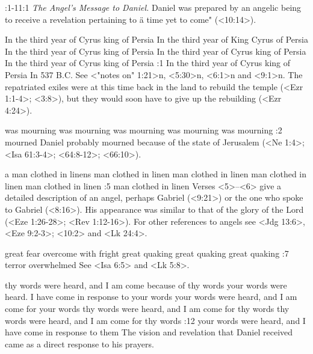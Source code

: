 :1-11:1 {} {\it The Angel's Message to Daniel.}\/ 
Daniel was prepared by an angelic being to receive a revelation pertaining to \"a time yet to come" (<10:14>).

    {In the third year of Cyrus king of Persia} %
    {In the third year of King Cyrus of Persia} %
    {In the third year of Cyrus king of Persia} %
    {In the third year of Cyrus king of Persia} %
    {In the third year of Cyrus king of Persia} %
:1 {In the third year of Cyrus king of Persia} In 537 B.C. See <"notes on" 1:21>n, <5:30>n, <6:1>n and <9:1>n. The repatriated exiles were at this 
time back in the land to rebuild the temple (<Ezr 1:1-4>; <3:8>), but they would soon have to give up the rebuilding (<Ezr 4:24>).

    {was mourning} %
    {was mourning} %
    {was mourning} %
    {was mourning} %
    {was mourning} %
:2 {mourned} Daniel probably mourned because of the state of Jerusalem (<Ne 1:4>; <Isa 61:3-4>; <64:8-12>; <66:10>).

    {a man clothed in linens} %
    {man clothed in linen} %
    {man clothed in linen} %
    {man clothed in linen} %
    {man clothed in linen} %
:5 {man clothed in linen} Verses <5>--<6> give a detailed description of an angel, perhaps Gabriel (<9:21>) or the one who spoke to  Gabriel (<8:16>). 
His appearance was similar to that of the glory of the Lord (<Eze 1:26-28>; <Rev 1:12-16>). For other references to angels see <Jdg 13:6>, <Eze 9:2-3>; <10:2> and <Lk 24:4>.

    {great fear} %
    {overcome with fright} %
    {great quaking} %
    {great quaking} %
    {great quaking} %
:7 {terror overwhelmed} See <Isa 6:5> and <Lk 5:8>.

    {thy words were heard, and I am come because of thy words} %
    {your words were heard. I have come in response to your words} %
    {your words were heard, and I am come for your words} %
    {thy words were heard, and I am come for thy words} %
    {thy words were heard, and I am come for thy words} %
:12 {your words were heard, and I have come in response to them}
The vision and revelation that Daniel received came as a direct response to his prayers.

